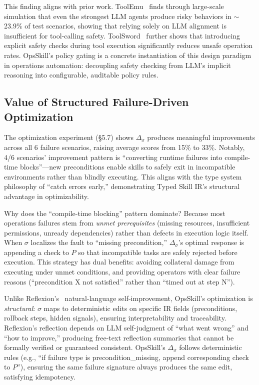 \documentclass[conference,10pt]{IEEEtran}
\begin{document}
This finding aligns with prior work.
ToolEmu~\cite{ruan2023toolemu} finds through large-scale simulation that even the strongest LLM agents produce risky behaviors in $\sim$23.9\% of test scenarios, showing that relying solely on LLM alignment is insufficient for tool-calling safety.
ToolSword~\cite{ye2024toolsword} further shows that introducing explicit safety checks during tool execution significantly reduces unsafe operation rates.
OpsSkill's policy gating is a concrete instantiation of this design paradigm in operations automation: decoupling safety checking from LLM's implicit reasoning into configurable, auditable policy rules.

\subsection{Value of Structured Failure-Driven Optimization}

The optimization experiment (\S5.7) shows $\Delta_\sigma$ produces meaningful improvements across all 6 failure scenarios, raising average scores from 15\% to 33\%.
Notably, 4/6 scenarios' improvement pattern is ``converting runtime failures into compile-time blocks''---new preconditions enable skills to safely exit in incompatible environments rather than blindly executing.
This aligns with the type system philosophy of ``catch errors early,'' demonstrating Typed Skill IR's structural advantage in optimizability.

Why does the ``compile-time blocking'' pattern dominate?
Because most operations failures stem from \emph{unmet prerequisites} (missing resources, insufficient permissions, unready dependencies) rather than defects in execution logic itself.
When $\sigma$ localizes the fault to ``missing precondition,'' $\Delta_\sigma$'s optimal response is appending a check to $P$ so that incompatible tasks are safely rejected before execution.
This strategy has dual benefits: avoiding collateral damage from executing under unmet conditions, and providing operators with clear failure reasons (``precondition X not satisfied'' rather than ``timed out at step N'').

Unlike Reflexion's~\cite{shinn2023reflexion} natural-language self-improvement, OpsSkill's optimization is \emph{structural}: $\sigma$ maps to deterministic edits on specific IR fields (preconditions, rollback steps, hidden signals), ensuring interpretability and traceability.
Reflexion's reflection depends on LLM self-judgment of ``what went wrong'' and ``how to improve,'' producing free-text reflection summaries that cannot be formally verified or guaranteed consistent.
OpsSkill's $\Delta_\sigma$ follows deterministic rules (e.g., ``if failure type is precondition\_missing, append corresponding check to $P$''), ensuring the same failure signature always produces the same edit, satisfying idempotency.
\end{document}
